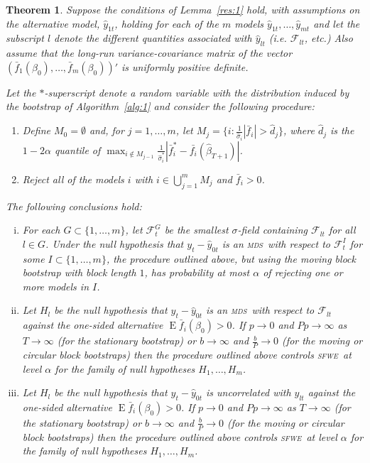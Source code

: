\documentclass[12pt,fleqn]{article}
\newtheorem{thm}{Theorem}
\theoremstyle{definition}
\DeclareMathOperator{\E}{E}
\newcommand{\mds}{\textsc{mds}}
\newcommand{\sfwe}{\textsc{sfwe}}
\begin{document}
\begin{thm}\label{res:2}
  Suppose the conditions of Lemma~\ref{res:1} hold, with assumptions
  on the alternative model, $\hat{y}_{1t}$, holding for each of the
  $m$ models $\hat{y}_{1t}, \dots, \hat{y}_{mt}$ and let the subscript
  $l$ denote the different quantities associated with $\hat{y}_{lt}$
  (i.e. $\mathcal{F}_{lt}$, etc.)  Also assume that the long-run
  variance-covariance matrix of the vector
  $(\bar{f}_1(\beta_0),\dots,\bar{f}_m(\beta_0))'$ is uniformly
  positive definite.

  Let the $*$-superscript denote a random variable with the
  distribution induced by the bootstrap of Algorithm~\ref{alg:1} and
  consider the following procedure:
  \begin{enumerate}
  \item Define $M_0 = \emptyset$ and, for $j = 1,\dots,m$, let $M_j =
    \{i : \tfrac1{\hat\sigma_i} |\bar{f}_{i}| > \hat{d}_j\}$, where
    $\hat{d}_j$ is the $1-2 \alpha$ quantile of $\max_{i \notin
      M_{j-1}} \tfrac{1}{\hat{\sigma}_i^{*}}|\bar{f}_{i}^{*} -
    \bar{f_i}(\hat{\beta}_{T+1})|$.
  \item Reject all of the models $i$ with $i \in \bigcup_{j=1}^m M_j$
    and $\bar f_i > 0$.
  \end{enumerate}
  The following conclusions hold:
  \begin{enumerate}[i.]
  \item\label{it:1} For each $G \subset \{1,\dots,m\}$, let
    $\mathcal{F}_t^G$ be the smallest $\sigma$-field containing
    $\mathcal{F}_{lt}$ for all $l \in G$.  Under the null hypothesis
    that $y_t - \hat{y}_{0t}$ is an \mds\ with respect to
    $\mathcal{F}_t^I$ for some $I \subset \{1,\dots,m\}$, the
    procedure outlined above, but using the moving block bootstrap
    with block length $1$, has probability at most $\alpha$ of rejecting
    one or more models in $I$.
  \item\label{it:2} Let $H_l$ be the null hypothesis that $y_t -
    \hat{y}_{0t}$ is an \mds\ with respect to $\mathcal{F}_{lt}$
    against the one-sided alternative $\E \bar f_i(\beta_0) > 0$.  If
    $p \to 0$ and $P p \to \infty$ as $T \to \infty$ (for the
    stationary bootstrap) or $b \to \infty$ and $\frac{b}{P} \to 0$
    (for the moving or circular block bootstraps) then the procedure
    outlined above controls \sfwe\ at level $\alpha$ for the family of
    null hypotheses $H_1,\dots,H_m$.
  \item\label{it:3} Let $H_l$ be the null hypothesis that $y_t -
    \hat{y}_{0t}$ is uncorrelated with $\hat{y}_{lt}$ against the
    one-sided alternative $\E \bar f_i(\beta_0) > 0$.  If $p \to 0$
    and $P p \to \infty$ as $T \to \infty$ (for the stationary
    bootstrap) or $b \to \infty$ and $\frac{b}{P} \to 0$ (for the
    moving or circular block bootstraps) then the procedure outlined
    above controls \sfwe\ at level $\alpha$ for the family of null
    hypotheses $H_1,\dots,H_m$.
  \end{enumerate}
\end{thm}
\end{document}
